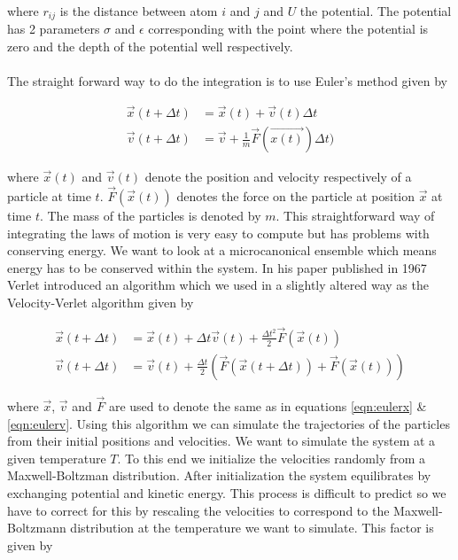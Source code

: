 \documentclass[10 pt, a4paper]{article}
\begin{document}
where $r_{ij}$ is the distance between atom $i$ and $j$ and $U$ the potential. The potential has 2 parameters $\sigma$ and $\epsilon$ corresponding with the point where the potential is zero and the depth of the potential well respectively.
\\
\\
The straight forward way to do the integration is to use Euler's method given by

\begin{align}
\vec{x}(t + \Delta t) &= \vec{x}(t) + \vec{v}(t) \Delta t  \label{eqn:eulerx} \\
\vec{v}(t + \Delta t) &= \vec{v} + \frac{1}{m} \vec{F}(\vec{x(t)}) \Delta t) \label{eqn:eulerv}
\end{align}

where $\vec{x}(t)$ and $\vec{v}(t)$ denote the position and velocity respectively of a particle at time $t$. $\vec{F}(\vec{x}(t))$ denotes the force on the particle at position $\vec{x}$ at time $t$. The mass of the particles is denoted by $m$. This straightforward way of integrating the laws of motion is very easy to compute but has problems with conserving energy. We want to look at a microcanonical ensemble which means energy has to be conserved within the system. In his paper published in 1967 Verlet \cite{verlet} introduced an algorithm which we used in a slightly altered way as the Velocity-Verlet algorithm given by

\begin{align}
\vec{x}(t + \Delta t) &= \vec{x}(t) + \Delta t \vec{v}(t) + \frac{\Delta t ^2}{2} \vec{F}(\vec{x}(t)) \\
\vec{v}(t + \Delta t) &= \vec{v}(t) + \frac{\Delta t}{2}(\vec{F}(\vec{x}(t + \Delta t)) + \vec{F}(\vec{x}(t)) )
\end{align}  

where $\vec{x}$, $\vec{v}$ and $\vec{F}$ are used to denote the same as in equations \ref{eqn:eulerx} \& \ref{eqn:eulerv}. Using this algorithm we can simulate the trajectories of the particles from their initial positions and velocities. We want to simulate the system at a given temperature $T$. To this end we initialize the velocities randomly from a Maxwell-Boltzman distribution. After initialization the system equilibrates by exchanging potential and kinetic energy. This process is difficult to predict so we have to correct for this by rescaling the velocities to correspond to the Maxwell-Boltzmann distribution at the temperature we want to simulate. This factor is given by
\end{document}
